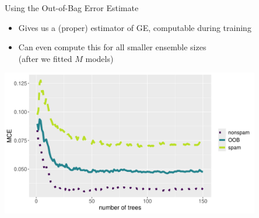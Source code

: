 \documentclass[11pt,compress,t,notes=noshow,xcolor=table]{beamer}
\begin{document}
\begin{vbframe}{Using the Out-of-Bag Error Estimate}

\begin{itemize}
  \item Gives us a (proper) estimator of GE, computable during training
  \item Can even compute this for all smaller ensemble sizes \\
    (after we fitted $M$ models)
\end{itemize}


\vspace{1em}

\begin{knitrout}\scriptsize
{}\color{fgcolor}

{\centering \includegraphics[width=0.85\textwidth]{figure/forest-oob.pdf}

}
\end{knitrout}

\end{vbframe}
\end{document}
